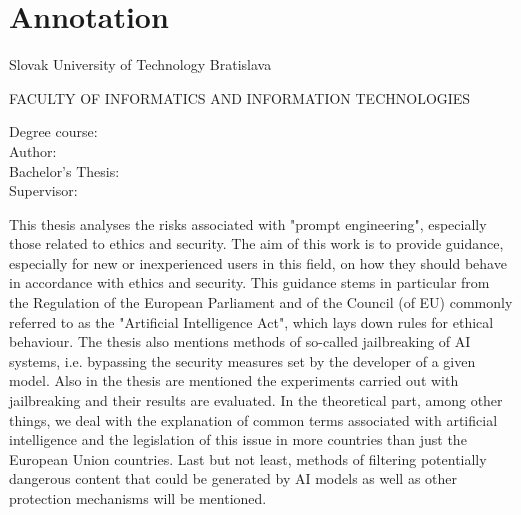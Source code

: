 \thispagestyle{empty}

\section*{Annotation}

\begin{minipage}[t]{1\columnwidth}%
Slovak University of Technology Bratislava

FACULTY OF INFORMATICS AND INFORMATION TECHNOLOGIES

Degree course: \hspace{1.4cm} \myStudyProgramEN\\

\noindent
Author: \hspace{2.6cm} \myName \\
Bachelor's Thesis: \hspace{0.75cm} \myTitleEN \\
Supervisor: \hspace{2cm} \mySupervisor \\
\noindent
\myDateENBPOne%
\end{minipage}

\bigskip{}

This thesis analyses the risks associated with "prompt engineering", especially those related to ethics and security. The aim of this work is to provide guidance, especially for new or inexperienced users in this field, on how they should behave in accordance with ethics and security. This guidance stems in particular from the Regulation of the European Parliament and of the Council (of EU) commonly referred to as the "Artificial Intelligence Act", which lays down rules for ethical behaviour. The thesis also mentions methods of so-called jailbreaking of AI systems, i.e. bypassing the security measures set by the developer of a given model. Also in the thesis are mentioned the experiments carried out with jailbreaking and their results are evaluated. In the theoretical part, among other things, we deal with the explanation of common terms associated with artificial intelligence and the legislation of this issue in more countries than just the European Union countries. Last but not least, methods of filtering potentially dangerous content that could be generated by AI models as well as other protection mechanisms will be mentioned.

\newpage{}\thispagestyle{empty}\medskip{}


\newpage{}

\newpage
\thispagestyle{empty}
\mbox{}
\newpage

